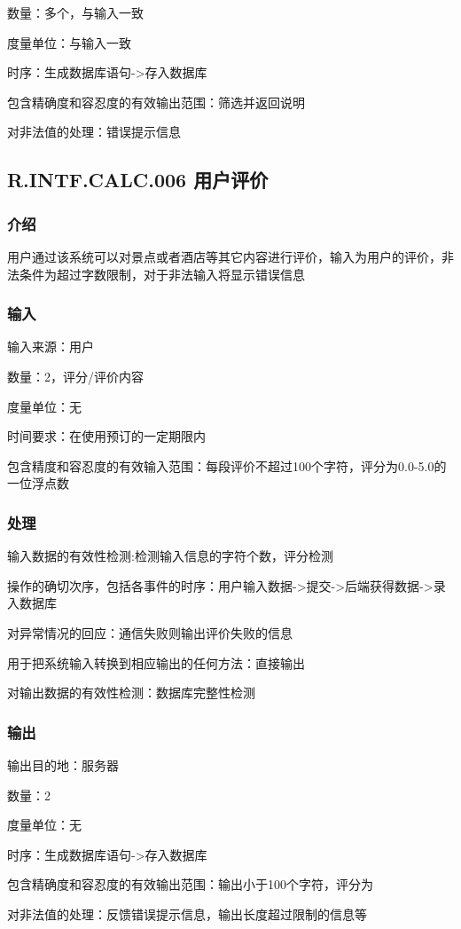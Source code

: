 		数量：多个，与输入一致

		度量单位：与输入一致

		时序：生成数据库语句->存入数据库

		包含精确度和容忍度的有效输出范围：筛选并返回说明

		对非法值的处理：错误提示信息



\subsection{R.INTF.CALC.006 用户评价}
\subsubsection{介绍}
用户通过该系统可以对景点或者酒店等其它内容进行评价，输入为用户的评价，非法条件为超过字数限制，对于非法输入将显示错误信息
\subsubsection{输入}
		输入来源：用户

		数量：2，评分/评价内容

		度量单位：无

		时间要求：在使用预订的一定期限内

		包含精度和容忍度的有效输入范围：每段评价不超过100个字符，评分为0.0-5.0的一位浮点数
\subsubsection{处理}
	输入数据的有效性检测:检测输入信息的字符个数，评分检测

	操作的确切次序，包括各事件的时序：用户输入数据->提交->后端获得数据->录入数据库

	对异常情况的回应：通信失败则输出评价失败的信息

	用于把系统输入转换到相应输出的任何方法：直接输出

	对输出数据的有效性检测：数据库完整性检测
\subsubsection{输出}
		输出目的地：服务器

		数量：2

		度量单位：无

		时序：生成数据库语句->存入数据库

		包含精确度和容忍度的有效输出范围：输出小于100个字符，评分为

		对非法值的处理：反馈错误提示信息，输出长度超过限制的信息等




